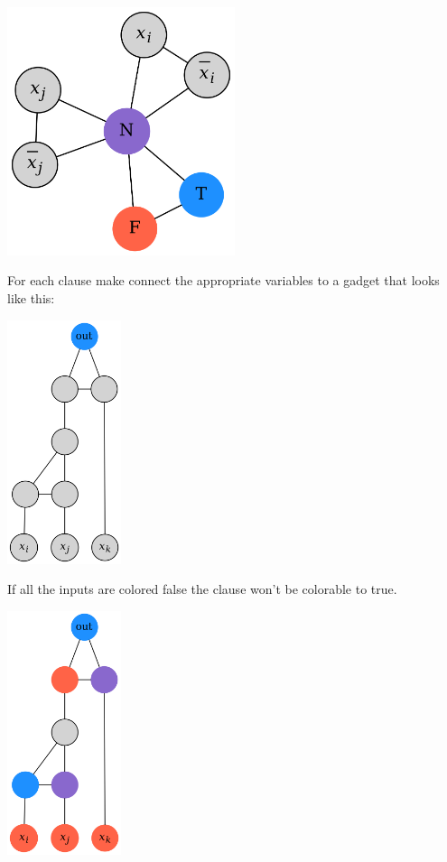 \documentclass[12pt, letterpaper]{article}
\begin{document}
		\begin{center}
		\includegraphics[width=0.5\textwidth]{./triFull.png}
		\end{center}

		For each clause make connect the appropriate variables to a gadget that looks like this:

		\begin{center}
		\includegraphics[width=0.25\textwidth]{./clause.png}
		\end{center}

		If all the inputs are colored false the clause won't be colorable to true.

		\begin{center}
		\includegraphics[width=0.25\textwidth]{./clauseProof.png}
		\end{center}
\end{document}
